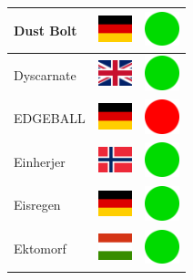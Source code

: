 \documentclass[12pt, a4paper, twoside]{report}
\begin{document}
\begin{center}
\begin{longtable}{|p{5cm}|p{2cm}|p{2cm}|}
 Dust Bolt                                                  & \includegraphics[width=1cm]{../4x3/de} &   \includegraphics[width=1cm]{../likes/y} \\ \hline
 Dyscarnate                                                 & \includegraphics[width=1cm]{../4x3/gb} &   \includegraphics[width=1cm]{../likes/y} \\ \hline
 EDGEBALL                                                   & \includegraphics[width=1cm]{../4x3/de} &   \includegraphics[width=1cm]{../likes/n} \\ \hline
 Einherjer                                                  & \includegraphics[width=1cm]{../4x3/no} &   \includegraphics[width=1cm]{../likes/y} \\ \hline
 Eisregen                                                   & \includegraphics[width=1cm]{../4x3/de} &   \includegraphics[width=1cm]{../likes/y} \\ \hline
 Ektomorf                                                   & \includegraphics[width=1cm]{../4x3/hu} &   \includegraphics[width=1cm]{../likes/y} \\ \hline

\end{longtable}
\end{center}
\end{document}
